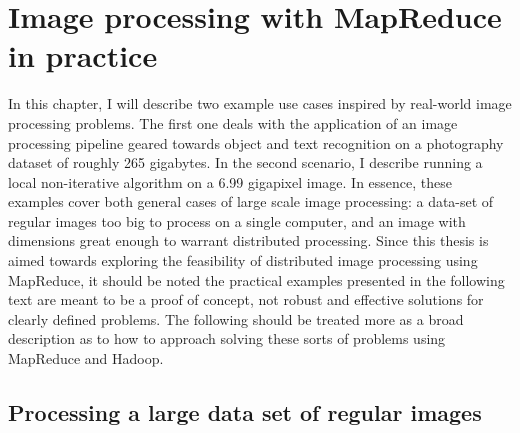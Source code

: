 \documentclass [12pt,a4paper]{report}
\begin{document}
\chapter{Image processing with MapReduce in practice}

In this chapter, I will describe two example use cases inspired by real-world image processing problems. The first one deals with the application of an image processing pipeline geared towards object and text recognition on a photography dataset of roughly 265 gigabytes. In the second scenario, I describe running a local non-iterative algorithm on a 6.99 gigapixel image. In essence, these examples cover both general cases of large scale image processing: a data-set of regular images too big to process on a single computer, and an image with dimensions great enough to warrant distributed processing.
Since this thesis is aimed towards exploring the feasibility of distributed image processing using MapReduce, it should be noted the practical examples presented in the following text are meant to be a proof of concept, not robust and effective solutions for clearly defined problems. The following should be treated more as a broad description as to how to approach solving these sorts of problems using MapReduce and Hadoop.

\section{Processing a large data set of regular images}
\end{document}
